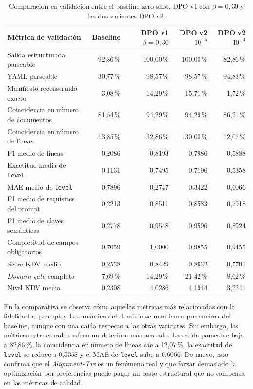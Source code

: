 \begin{table}[htbp]
\centering
\caption{Comparación en validación entre el baseline zero-shot, DPO v1 con \(\beta=0{,}30\) y las dos variantes DPO v2.}
\label{tab:ch7_dpo_v2_lr1e4_validation}
\scriptsize
\begin{tabularx}{\textwidth}{Xrrrr}
\toprule
\textbf{Métrica de validación} & \textbf{Baseline} & \textbf{DPO v1 \(\beta=0{,}30\)} & \textbf{DPO v2 \(10^{-5}\)} & \textbf{DPO v2 \(10^{-4}\)} \\
\midrule
Salida estructurada parseable & 92,86\,\% & 100,00\,\% & 100,00\,\% & 82,86\,\% \\
YAML parseable & 30,77\,\% & 98,57\,\% & 98,57\,\% & 94,83\,\% \\
Manifiesto reconstruido exacto & 3,08\,\% & 14,29\,\% & 15,71\,\% & 1,72\,\% \\
Coincidencia en número de documentos & 81,54\,\% & 94,29\,\% & 94,29\,\% & 86,21\,\% \\
Coincidencia en número de líneas & 13,85\,\% & 32,86\,\% & 30,00\,\% & 12,07\,\% \\
F1 medio de líneas & 0,2086 & 0,8193 & 0,7986 & 0,5888 \\
Exactitud media de \texttt{level} & 0,1131 & 0,7495 & 0,7196 & 0,5358 \\
MAE medio de \texttt{level} & 0,7896 & 0,2747 & 0,3422 & 0,6066 \\
F1 medio de requisitos del prompt & 0,2213 & 0,8511 & 0,8583 & 0,7918 \\
F1 medio de claves semánticas & 0,2778 & 0,9548 & 0,9596 & 0,8924 \\
Completitud de campos obligatorios & 0,7059 & 1,0000 & 0,9855 & 0,9455 \\
Score KDV medio & 0,2538 & 0,8429 & 0,8632 & 0,7701 \\
\textit{Domain gate} completo & 7,69\,\% & 14,29\,\% & 21,42\,\% & 8,62\,\% \\
Nivel KDV medio & 0,2308 & 4,0286 & 4,1944 & 3,2241 \\
\bottomrule
\end{tabularx}
\end{table}
\clearpage

En la comparativa se observa cómo aquellas métricas más relacionadas con la fidelidad al prompt y la semántica
del dominio se mantienen por encima del baseline, aunque con una caída respecto a las otras variantes.
Sin embargo, las métricas estructurales sufren un deterioro más acusado. La salida parseable baja a 82,86\,\%, la
coincidencia en número de líneas cae a 12,07\,\%, la exactitud de \texttt{level} se reduce a 0,5358 y el MAE
de \texttt{level} sube a 0,6066. De nuevo, esto confirma que el \textit{Alignment-Tax} es un fenómeno real y que
forzar demasiado la optimización por preferencias puede pagar un coste estructural que no compensa en las métricas
de calidad.

